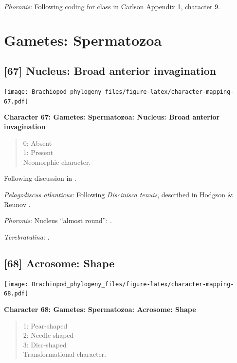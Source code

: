 \documentclass[openany]{book}
\theoremstyle{definition}
\theoremstyle{definition}
\theoremstyle{definition}
\theoremstyle{remark}
\begin{document}
\hypertarget{Phoronis-coding-66}{}
\emph{Phoronis}: Following coding for class in Carlson
\citeyearpar{Carlson1995Phylogeneticrelationships} Appendix 1, character
9.

\section{Gametes: Spermatozoa}\label{gametes-spermatozoa}

\subsection*{{[}67{]} Nucleus: Broad anterior
invagination}\label{nucleus-broad-anterior-invagination}

\texttt{[image: Brachiopod\_phylogeny\_files/figure-latex/character-mapping-67.pdf]}

\textbf{Character 67: Gametes: Spermatozoa: Nucleus: Broad anterior
invagination}

\begin{quote}
0: Absent\\
1: Present\\
Neomorphic character.
\end{quote}

Following discussion in \citet{Hodgson1994Ultrastructureof}.

\hypertarget{Pelagodiscus_atlanticus-coding-67}{}
\emph{Pelagodiscus atlanticus}: Following \emph{Discinisca}
\emph{tenuis}, described in Hodgson \& Reunov
\citeyearpar{Hodgson1994Ultrastructureof}.

\hypertarget{Phoronis-coding-67}{}
\emph{Phoronis}: Nucleus ``almost round'':
\citet{Reunov2004Ultrastructuralstudy}.

\hypertarget{Terebratulina-coding-67}{}
\emph{Terebratulina}: \citet{Hodgson1994Ultrastructureof}.

\subsection*{{[}68{]} Acrosome: Shape}\label{acrosome-shape}

\texttt{[image: Brachiopod\_phylogeny\_files/figure-latex/character-mapping-68.pdf]}

\textbf{Character 68: Gametes: Spermatozoa: Acrosome: Shape}

\begin{quote}
1: Pear-shaped\\
2: Needle-shaped\\
3: Disc-shaped\\
Transformational character.
\end{quote}
\end{document}

